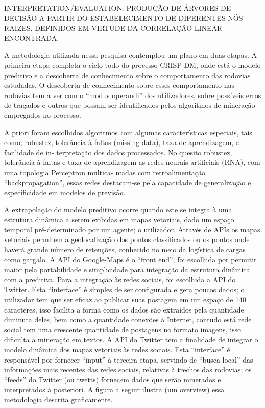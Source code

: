 \documentclass[conference,compsoc]{IEEEtran}
\begin{document}
INTERPRETATION/EVALUATION: PRODUÇÃO DE ÁRVORES DE DECISÃO A PARTIR DO ESTABELECIMENTO DE DIFERENTES NÓS-RAIZES, DEFINIDOS EM VIRTUDE DA CORRELAÇÃO
LINEAR ENCONTRADA.


A metodologia utilizada nessa pesquisa contemplou um plano em duas etapas. 
A primeira etapa  completa o ciclo todo do processo CRISP-DM, onde está o modelo preditivo e a descoberta de 
conhecimento sobre o comportamento das rodovias estudadas. O descoberta de conhecimento sobre esses comportamento nas rodovias tem 
a ver com o “modus operandi” dos utilizadores, sobre possíveis erros de traçados e outros que possam ser identificados pelos algoritmos 
de mineração empregados no processo.

A priori foram escolhidos algoritmos com algumas características especiais, tais como; robustez, tolerância à faltas (missing data), 
taxa de aprendizagem, e facilidade de in- terpretação dos dados processados. No quesito robustez, tolerância à faltas e taxa de 
aprendizagem as redes neurais artificiais (RNA), com uma topologia Perceptron multica- madas com retroalimentação “backpropagation”, 
essas redes destacam-se pela capacidade de generalização e especificidade em modelos de previsão.

A extrapolação do modelo preditivo ocorre quando este se integra à uma estrutura dinâmica a serem exibidas em mapas vetoriais, dado um espaço temporal pré-determinado por um agente; o utilizador. Através de APIs os mapas vetoriais permitem a geolocalização dos pontos classificados ou os pontos onde haverá grande número de retenções, conhecido no meio da logística de cargas como gargalo. A API do Google-Maps é o “front end”, foi escolhida por permitir maior pela
portabilidade e simplicidade para integração da estrutura dinâmica com a preditiva.
Para a integração às redes sociais, foi escolhida a API do Twitter. Esta “interface” é simples de ser configurada e gera poucos dados; o utilizador tem que ser eficaz ao publicar suas postagem em um espaço de 140 caracteres, isso facilita a forma como os dados são extraídos pela quantidade diminuta deles, bem como a quantidade conexões à Internet, contudo está rede social tem uma crescente quantidade de postagens no formato imagens, isso dificulta a mineração em textos. A API do Twitter tem a finalidade de integrar o modelo dinâmica dos mapas vetoriais às redes sociais. Esta “interface” é responsável por fornecer “input” à terceira etapa, servindo de “busca local” das informações mais recentes das redes sociais, relativas à trechos das rodovias; os “feeds” do Twitter (ou twetts) fornecem dados que serão minerados e interpretados à posteriori.
A figura a seguir ilustra (um overview) essa metodologia descrita graficamente.
\end{document}

